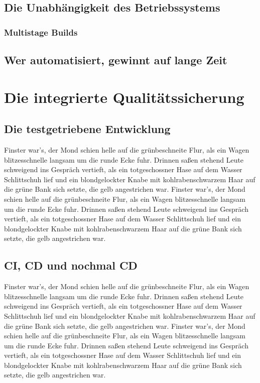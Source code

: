 \section{Die Unabhängigkeit des Betriebssystems}
\subsection{Multistage Builds}

\section{Wer automatisiert, gewinnt auf lange Zeit}

\chapter{Die integrierte Qualitätssicherung}

\section{Die testgetriebene Entwicklung}

Finster war's, der Mond schien helle auf die grünbeschneite Flur, als
ein Wagen blitzesschnelle langsam um die runde Ecke fuhr. Drinnen
saßen stehend Leute schweigend ins Gespräch vertieft, als ein
totgeschossner Hase auf dem Wasser Schlittschuh lief und ein
blondgelockter Knabe mit kohlrabenschwarzem Haar auf die grüne Bank
sich setzte, die gelb angestrichen war.
Finster war's, der Mond schien helle auf die grünbeschneite Flur, als
ein Wagen blitzesschnelle langsam um die runde Ecke fuhr. Drinnen
saßen stehend Leute schweigend ins Gespräch vertieft, als ein
totgeschossner Hase auf dem Wasser Schlittschuh lief und ein
blondgelockter Knabe mit kohlrabenschwarzem Haar auf die grüne Bank
sich setzte, die gelb angestrichen war.

\section{CI, CD und nochmal CD}
\label{sec:ci-cd-und-nochmal-cd}


Finster war's, der Mond schien helle auf die grünbeschneite Flur, als
ein Wagen blitzesschnelle langsam um die runde Ecke fuhr. Drinnen
saßen stehend Leute schweigend ins Gespräch vertieft, als ein
totgeschossner Hase auf dem Wasser Schlittschuh lief und ein
blondgelockter Knabe mit kohlrabenschwarzem Haar auf die grüne Bank
sich setzte, die gelb angestrichen war.
Finster war's, der Mond schien helle auf die grünbeschneite Flur, als
ein Wagen blitzesschnelle langsam um die runde Ecke fuhr. Drinnen
saßen stehend Leute schweigend ins Gespräch vertieft, als ein
totgeschossner Hase auf dem Wasser Schlittschuh lief und ein
blondgelockter Knabe mit kohlrabenschwarzem Haar auf die grüne Bank
sich setzte, die gelb angestrichen war.


